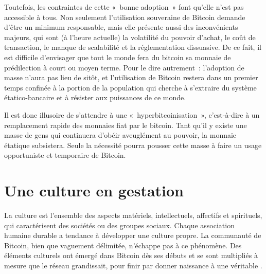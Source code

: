 Toutefois, les contraintes de cette «~bonne adoption~» font qu'elle n'est pas accessible à tous. Non seulement l'utilisation souveraine de Bitcoin demande d'être un minimum responsable, mais elle présente aussi des inconvénients majeurs, qui sont (à l'heure actuelle) la volatilité du pouvoir d'achat, le coût de transaction, le manque de scalabilité et la réglementation dissuasive. De ce fait, il est difficile d'envisager que tout le monde fera du bitcoin sa monnaie de prédilection à court ou moyen terme. Pour le dire autrement~: l'adoption de masse n'aura pas lieu de sitôt, et l'utilisation de Bitcoin restera dans un premier temps confinée à la portion de la population qui cherche à s'extraire du système étatico-bancaire et à résister aux puissances de ce monde.

Il est donc illusoire de s'attendre à une «~hyperbitcoinisation~», c'est-à-dire à un remplacement rapide des monnaies fiat par le bitcoin. Tant qu'il y existe une masse de gens qui continuera d'obéir aveuglément au pouvoir, la monnaie étatique subsistera. Seule la nécessité pourra pousser cette masse à faire un usage opportuniste et temporaire de Bitcoin.

\vspace{-1em}
\section*{Une culture en gestation}

La culture est l'ensemble des aspects matériels, intellectuels, affectifs et spirituels, qui caractérisent des sociétés ou des groupes sociaux. Chaque association humaine durable a tendance à développer une culture propre. La communauté de Bitcoin, bien que vaguement délimitée, n'échappe pas à ce phénomène. Des éléments culturels ont émergé dans Bitcoin dès ses débuts et se sont multipliés à mesure que le réseau grandissait, pour finir par donner naissance à une véritable .

